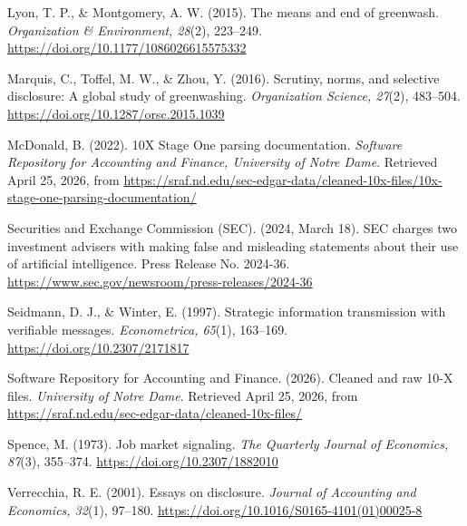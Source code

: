 Lyon, T. P., \& Montgomery, A. W. (2015). The means and end of greenwash. \textit{Organization \& Environment, 28}(2), 223--249. \url{https://doi.org/10.1177/1086026615575332}

Marquis, C., Toffel, M. W., \& Zhou, Y. (2016). Scrutiny, norms, and selective disclosure: A global study of greenwashing. \textit{Organization Science, 27}(2), 483--504. \url{https://doi.org/10.1287/orsc.2015.1039}

McDonald, B. (2022). 10X Stage One parsing documentation. \textit{Software Repository for Accounting and Finance, University of Notre Dame}. Retrieved April 25, 2026, from \url{https://sraf.nd.edu/sec-edgar-data/cleaned-10x-files/10x-stage-one-parsing-documentation/}

Securities and Exchange Commission (SEC). (2024, March 18). SEC charges two investment advisers with making false and misleading statements about their use of artificial intelligence. Press Release No. 2024-36. \url{https://www.sec.gov/newsroom/press-releases/2024-36}

Seidmann, D. J., \& Winter, E. (1997). Strategic information transmission with verifiable messages. \textit{Econometrica, 65}(1), 163--169. \url{https://doi.org/10.2307/2171817}

Software Repository for Accounting and Finance. (2026). Cleaned and raw 10-X files. \textit{University of Notre Dame}. Retrieved April 25, 2026, from \url{https://sraf.nd.edu/sec-edgar-data/cleaned-10x-files/}

Spence, M. (1973). Job market signaling. \textit{The Quarterly Journal of Economics, 87}(3), 355--374. \url{https://doi.org/10.2307/1882010}

Verrecchia, R. E. (2001). Essays on disclosure. \textit{Journal of Accounting and Economics, 32}(1), 97--180. \url{https://doi.org/10.1016/S0165-4101(01)00025-8}

\endgroup
